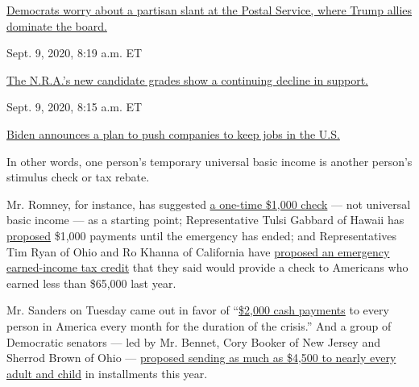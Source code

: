 \href{https://www.nytimes3xbfgragh.onion/live/2020/09/09/us/trump-vs-biden\#democrats-worry-about-a-partisan-slant-at-the-postal-service-where-trump-allies-dominate-the-board}{Democrats
worry about a partisan slant at the Postal Service, where Trump allies
dominate the
board.}\href{https://www.nytimes3xbfgragh.onion/live/2020/09/09/us/trump-vs-biden\#the-nras-new-candidate-grades-show-a-continuing-decline-in-support}{}

Sept. 9, 2020, 8:19 a.m. ET

\href{https://www.nytimes3xbfgragh.onion/live/2020/09/09/us/trump-vs-biden\#the-nras-new-candidate-grades-show-a-continuing-decline-in-support}{The
N.R.A.'s new candidate grades show a continuing decline in
support.}\href{https://www.nytimes3xbfgragh.onion/live/2020/09/09/us/trump-vs-biden\#biden-announces-a-plan-to-push-companies-to-keep-jobs-in-the-us}{}

Sept. 9, 2020, 8:15 a.m. ET

\href{https://www.nytimes3xbfgragh.onion/live/2020/09/09/us/trump-vs-biden\#biden-announces-a-plan-to-push-companies-to-keep-jobs-in-the-us}{Biden
announces a plan to push companies to keep jobs in the U.S.}

In other words, one person's temporary universal basic income is another
person's stimulus check or tax rebate.

Mr. Romney, for instance, has suggested
\href{https://www.romney.senate.gov/romney-calls-urgent-action-additional-coronavirus-response-measures}{a
one-time \$1,000 check} --- not universal basic income --- as a starting
point; Representative Tulsi Gabbard of Hawaii has
\href{https://gabbard.house.gov/news/press-releases/rep-tulsi-gabbard-introduces-resolution-calling-emergency-universal-basic}{proposed}
\$1,000 payments until the emergency has ended; and Representatives Tim
Ryan of Ohio and Ro Khanna of California have
\href{https://timryan.house.gov/media/press-releases/congressmen-tim-ryan-ro-khanna-propose-cash-infusion-working-americans-during}{proposed
an emergency earned-income tax credit} that they said would provide a
check to Americans who earned less than \$65,000 last year.

Mr. Sanders on Tuesday came out in favor of
``\href{https://berniesanders.com/issues/emergency-response-coronavirus-pandemic/}{\$2,000
cash payments} to every person in America every month for the duration
of the crisis.'' And a group of Democratic senators --- led by Mr.
Bennet, Cory Booker of New Jersey and Sherrod Brown of Ohio ---
\href{https://www.bennet.senate.gov/public/_cache/files/9/2/925b76ae-271c-4e77-be5f-eb0d7f5c5ac6/B772110F661116948B00571DD63BB0E7.cash-payments-letter.pdf}{proposed
sending as much as \$4,500 to nearly every adult and child} in
installments this year.

